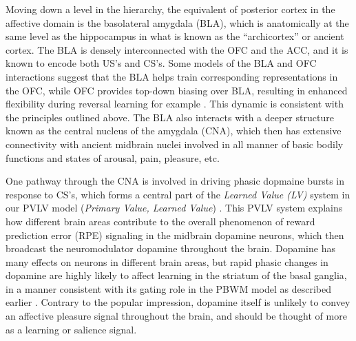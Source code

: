 \documentclass[11pt,twoside]{article}
\begin{document}
Moving down a level in the hierarchy, the equivalent of posterior cortex in
the affective domain is the basolateral amygdala (BLA), which is anatomically
at the same level as the hippocampus in what is known as the ``archicortex'' or
ancient cortex.  The BLA is densely interconnected with the OFC and the ACC,
and it is known to encode both US's and CS's.  Some models of the BLA and OFC
interactions suggest that the BLA helps train corresponding representations in
the OFC, while OFC provides top-down biasing over BLA, resulting in enhanced
flexibility during reversal learning for example \cite{FrankClaus06,PauliHazyOReilly12}.  This dynamic is consistent with the
principles outlined above.  The BLA also interacts with a deeper structure
known as the central nucleus of the amygdala (CNA), which then has extensive
connectivity with ancient midbrain nuclei involved in all manner of basic
bodily functions and states of arousal, pain, pleasure, etc.

One pathway through the CNA is involved in driving phasic dopmaine bursts in
response to CS's, which forms a central part of the {\em Learned Value (LV)}
system in our PVLV model ({\em Primary Value, Learned Value})
\cite{OReillyFrankHazyEtAl07,HazyFrankOReilly10}.  This PVLV system explains how different
brain areas contribute to the overall phenomenon of reward prediction error
(RPE) signaling in the midbrain dopamine neurons, which then broadcast the
neuromodulator dopamine throughout the brain.  Dopamine has many effects on
neurons in different brain areas, but rapid phasic changes in dopamine are
highly likely to affect learning in the striatum of the basal ganglia, in a
manner consistent with its gating role in the PBWM model as described earlier
\cite{Frank05}.  Contrary to the popular impression, dopamine itself is
unlikely to convey an affective pleasure signal throughout the brain, 
and should be thought of more as a learning or salience signal.
\end{document}
